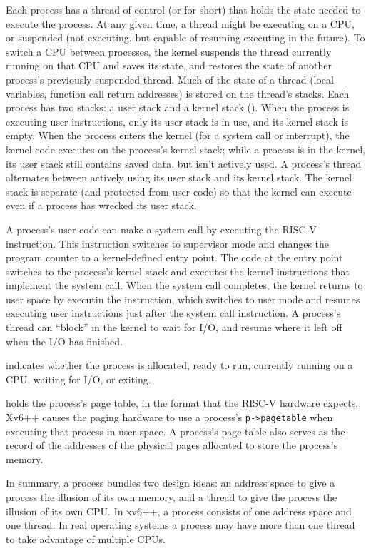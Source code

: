 Each process has a thread of control (or
for short) that holds the state needed to execute the process.
At any given time, a thread might be executing on a CPU,
or suspended (not executing, but capable of resuming executing
in the future).
To switch a CPU between processes,
the kernel suspends the thread currently running on that CPU
and saves its state,
and restores the state of another process's previously-suspended
thread.  Much of the state of a thread (local variables, function call return
addresses) is stored on the thread's stacks.
Each process has two stacks: a user stack and a kernel stack
().
When the process is executing user instructions, only its user stack
is in use, and its kernel stack is empty.
When the process enters the kernel (for a system call or interrupt),
the kernel code executes on the process's kernel stack; while
a process is in the kernel, its user stack still contains saved
data, but isn't actively used.
A process's thread alternates between actively using its user stack
and its kernel stack. The kernel stack is separate (and protected from
user code) so that the kernel
can execute even if a process has wrecked its user stack.

A process's user code
can make a system call by executing the RISC-V 
instruction. This instruction switches to supervisor mode and
changes the program counter to a kernel-defined entry point.  The code
at the entry point switches to the process's kernel stack and executes the kernel
instructions that implement the system call.  When the system call
completes, the kernel returns to
user space by executin the  instruction, which switches
to user mode and resumes executing user instructions
just after the system call instruction.  A process's thread can
``block'' in the kernel to wait for I/O, and resume where it left off
when the I/O has finished.

indicates whether the process is allocated, ready
to run, currently running on a CPU, waiting for I/O, or exiting.

holds the process's page table, in the format
that the RISC-V hardware expects.
Xv6++ causes the paging hardware to use a process's
\lstinline{p->pagetable}
when executing that process in user space.
A process's page table also serves as the record of the
addresses of the physical pages allocated to store the process's
memory.

In summary, a process bundles two design ideas: an address space to
give a process the illusion of its own memory, and a thread to give
the process the illusion of its own CPU.  In xv6++, a process consists
of one address space and one thread.  In real operating systems a
process may have more than one thread to take advantage of multiple CPUs.

